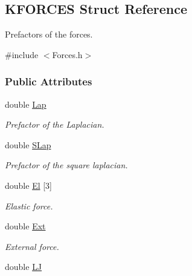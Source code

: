 \hypertarget{structKFORCES}{\subsection{\-K\-F\-O\-R\-C\-E\-S \-Struct \-Reference}
\label{structKFORCES}
}


\-Prefactors of the forces.  




{\ttfamily \#include $<$\-Forces.\-h$>$}

\subsubsection*{\-Public \-Attributes}
\begin{DoxyCompactItemize}
\item 
\hypertarget{structKFORCES_ad68dc62d6c1b859ad3abebc60476453e}{double \hyperlink{structKFORCES_ad68dc62d6c1b859ad3abebc60476453e}{\-Lap}}\label{structKFORCES_ad68dc62d6c1b859ad3abebc60476453e}

\begin{DoxyCompactList}\small\item\em \-Prefactor of the \-Laplacian. \end{DoxyCompactList}\item 
\hypertarget{structKFORCES_a348745786658bd8382be1fd25066a309}{double \hyperlink{structKFORCES_a348745786658bd8382be1fd25066a309}{\-S\-Lap}}\label{structKFORCES_a348745786658bd8382be1fd25066a309}

\begin{DoxyCompactList}\small\item\em \-Prefactor of the square laplacian. \end{DoxyCompactList}\item 
\hypertarget{structKFORCES_a682d0bf554363bfcb9698c55bd6a0527}{double \hyperlink{structKFORCES_a682d0bf554363bfcb9698c55bd6a0527}{\-El} \mbox{[}3\mbox{]}}\label{structKFORCES_a682d0bf554363bfcb9698c55bd6a0527}

\begin{DoxyCompactList}\small\item\em \-Elastic force. \end{DoxyCompactList}\item 
\hypertarget{structKFORCES_a60a1f1fb24ef62e5433e4c50466a1624}{double \hyperlink{structKFORCES_a60a1f1fb24ef62e5433e4c50466a1624}{\-Ext}}\label{structKFORCES_a60a1f1fb24ef62e5433e4c50466a1624}

\begin{DoxyCompactList}\small\item\em \-External force. \end{DoxyCompactList}\item 
\hypertarget{structKFORCES_a014d64316c28b7014a2e8696ea99388f}{double \hyperlink{structKFORCES_a014d64316c28b7014a2e8696ea99388f}{\-L\-J}}\label{structKFORCES_a014d64316c28b7014a2e8696ea99388f}


\end{DoxyCompactItemize}
